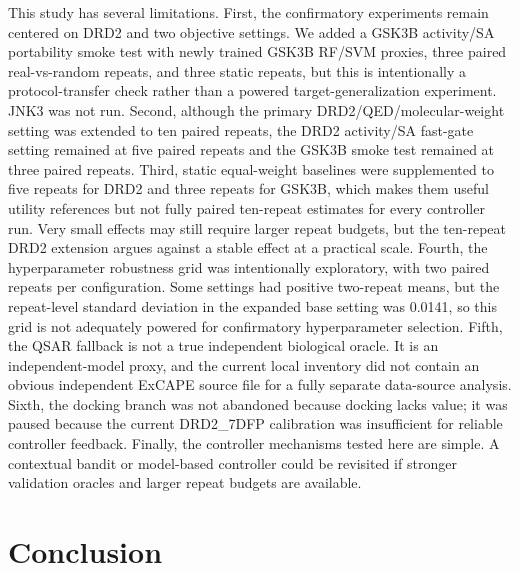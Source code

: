 \documentclass[referee,lineno,pdflatex,sn-basic]{sn-jnl}
\theoremstyle{thmstyleone}%
\theoremstyle{thmstyletwo}%
\theoremstyle{thmstylethree}%
\begin{document}
This study has several limitations. First, the confirmatory experiments remain centered on DRD2 and two objective settings. We added a GSK3B activity/SA portability smoke test with newly trained GSK3B RF/SVM proxies, three paired real-vs-random repeats, and three static repeats, but this is intentionally a protocol-transfer check rather than a powered target-generalization experiment. JNK3 was not run. Second, although the primary DRD2/QED/molecular-weight setting was extended to ten paired repeats, the DRD2 activity/SA fast-gate setting remained at five paired repeats and the GSK3B smoke test remained at three paired repeats. Third, static equal-weight baselines were supplemented to five repeats for DRD2 and three repeats for GSK3B, which makes them useful utility references but not fully paired ten-repeat estimates for every controller run. Very small effects may still require larger repeat budgets, but the ten-repeat DRD2 extension argues against a stable effect at a practical scale. Fourth, the hyperparameter robustness grid was intentionally exploratory, with two paired repeats per configuration. Some settings had positive two-repeat means, but the repeat-level standard deviation in the expanded base setting was 0.0141, so this grid is not adequately powered for confirmatory hyperparameter selection. Fifth, the QSAR fallback is not a true independent biological oracle. It is an independent-model proxy, and the current local inventory did not contain an obvious independent ExCAPE source file for a fully separate data-source analysis. Sixth, the docking branch was not abandoned because docking lacks value; it was paused because the current DRD2\_7DFP calibration was insufficient for reliable controller feedback. Finally, the controller mechanisms tested here are simple. A contextual bandit or model-based controller could be revisited if stronger validation oracles and larger repeat budgets are available.

\section{Conclusion}\label{sec:conclusion}
\end{document}

